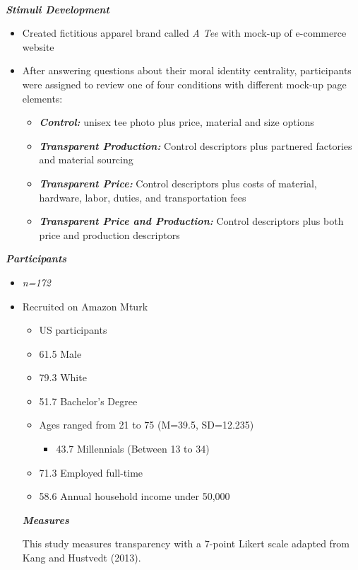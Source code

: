 \documentclass[a0,portrait]{a0poster}
\begin{document}
\begin{minipage}[c]{\linewidth}
\begin{framed}
\begin{multicols}{2}
\\
\color{Maroon}
\textbf{\emph{Stimuli Development}}
\color{Black}
\begin{itemize}
    \item Created fictitious apparel brand called \textit{A\text{\_} Tee} with mock-up of e-commerce website
    \item After answering questions about their moral identity centrality, participants were assigned to review one of four conditions with different mock-up page elements:
    \begin{itemize}
        \item \textbf{\emph{Control:}} unisex tee photo plus price, material and size options
        \item \textbf{\emph{Transparent Production:}} Control descriptors plus partnered factories and material sourcing
         \item \textbf{\emph{Transparent Price:}} Control descriptors plus costs of material, hardware, labor, duties, and transportation fees
         \item \textbf{\emph{Transparent Price and Production:}} Control descriptors plus both price and production descriptors
    \end{itemize}
\end{itemize}
\color{Maroon}
\textbf{\emph{Participants}}
\color{Black}
\begin{itemize}
\item \textit{n=172}
\item Recruited on Amazon Mturk
\begin{itemize}
    \item US participants 
    \item 61.5\text{\%} Male
    \item 79.3\text{\%} White
    \item 51.7\text{\%} Bachelor's Degree
    \item Ages ranged from 21 to 75 (M=39.5, SD=12.235)
    \begin{itemize}
        \item 43.7\text{\%} Millennials (Between 13 to 34)
    \end{itemize}
    \item 71.3\text{\%} Employed full-time
    \item 58.6\text{\%} Annual household income under \text{\$}50,000
\end{itemize}
\color{Maroon}
\textbf{\emph{Measures}}
\color{Black}

This study measures transparency with a 7-point Likert scale adapted from Kang and Hustvedt (2013)\autocite{kang_building_2013}.
\end{itemize}
\color{Maroon}

\end{multicols}
\end{framed}
\end{minipage}
\end{document}
